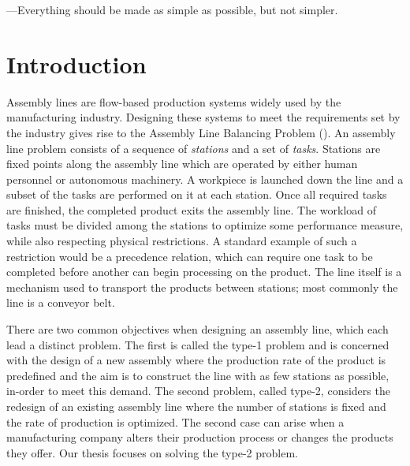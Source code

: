 
\begin{savequote}%
---Everything should be made as simple as possible, but not simpler.
\end{savequote}

\chapter{Introduction}
\label{chap:intro}
Assembly lines are flow-based production systems widely used by
the manufacturing industry.
Designing these systems to meet the requirements set
by the industry gives rise to the Assembly Line
Balancing Problem (\albp{}).
An assembly line problem consists of a sequence
of \emph{stations} and a set of \emph{tasks}.
Stations are fixed points along the assembly
line which are operated by either human personnel
or autonomous machinery.
A workpiece is launched down the line and 
a subset of the tasks are performed on it at each station.
Once all required tasks are finished, the completed product
exits the assembly line.
The workload of tasks must be divided among the stations
to optimize some performance measure,
while also respecting physical restrictions.
A standard example of such a restriction would be a
precedence relation, which can require
one task to be completed before another can begin
processing on the product.
The line itself is a mechanism used to
transport the products between stations;
most commonly the line is a conveyor belt.

There are two common objectives when designing an assembly
line, which each lead a distinct problem.
The first is called the type-1 problem and is concerned with
the design of a new assembly where the production rate
of the product is predefined and the aim is to construct the line
with as few stations as possible, in-order to meet this demand.
The second problem, called type-2, considers the redesign of an existing
assembly line where the number of stations is fixed and the rate
of production is optimized.
The second case can arise when a manufacturing company alters their
production process or changes the products they offer.
Our thesis focuses on solving the type-2 problem.

